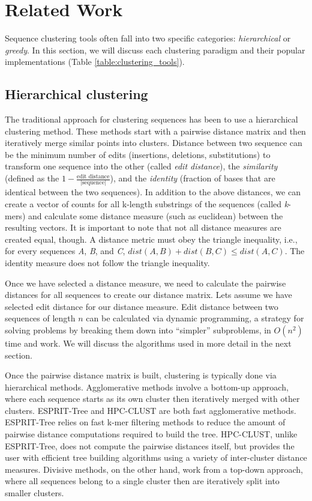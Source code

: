 \section{Related Work}

Sequence clustering tools often fall into two specific categories: \emph{hierarchical} or \emph{greedy}.
In this section, we will discuss each clustering paradigm and their popular implementations (Table \ref{table:clustering_tools}).



\subsection{Hierarchical clustering}
The traditional approach for clustering sequences has been to use a hierarchical clustering method.
These methods start with a pairwise distance matrix and then iteratively merge similar points into clusters.
Distance between two sequence can be the minimum number of edits (insertions, deletions, substitutions) to transform one sequence into the other (called \emph{edit distance}), the \emph{similarity} (defined as the $1 - \frac{\text{edit distance}}{|\text{sequence}|}$), and the \emph{identity} (fraction of bases that are identical between the two sequences).
In addition to the above distances, we can create a vector of counts for all k-length substrings of the sequences (called \emph{k}-mers) and calculate some distance measure (such as euclidean) between the resulting vectors.
It is important to note that not all distance measures are created equal, though.
A distance metric must obey the triangle inequality, i.e., for every sequences \emph{A}, \emph{B}, and \emph{C}, $dist(A,B) + dist(B,C) \leq dist(A,C)$.
The identity measure does not follow the triangle inequality.

Once we have selected a distance measure, we need to calculate the pairwise distances for all sequences to create our distance matrix.
Lets assume we have selected edit distance for our distance measure.
Edit distance between two sequences of length $n$ can be calculated via dynamic programming, a strategy for solving problems by breaking them down into ``simpler'' subproblems, in $O(n^2)$ time and work.
We will discuss the algorithms used in more detail in the next section.

Once the pairwise distance matrix is built, clustering is typically done via hierarchical methods.
Agglomerative methods involve a bottom-up approach, where each sequence starts as its own cluster then iteratively merged with other clusters.
ESPRIT-Tree\cite{cai_esprit-tree:_2011} and HPC-CLUST\cite{rodrigues_hpc-clust:_2014} are both fast agglomerative methods.
ESPRIT-Tree relies on fast k-mer filtering methods to reduce the amount of pairwise distance computations required to build the tree.
HPC-CLUST, unlike ESPRIT-Tree, does not compute the pairwise distances itself, but provides the user with efficient tree building algorithms using a variety of inter-cluster distance measures.
Divisive methods, on the other hand, work from a top-down approach, where all sequences belong to a single cluster then are iteratively split into smaller clusters.


